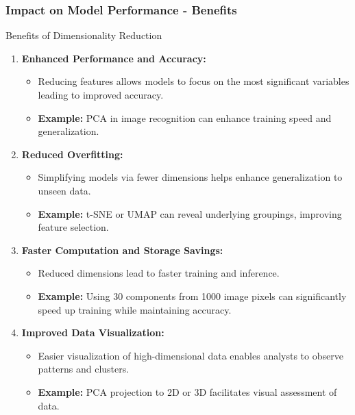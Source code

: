 \documentclass[aspectratio=169]{beamer}
\begin{document}
\begin{frame}[fragile]
    \frametitle{Impact on Model Performance - Benefits}
    \begin{block}{Benefits of Dimensionality Reduction}
        \begin{enumerate}
            \item \textbf{Enhanced Performance and Accuracy:}
            \begin{itemize}
                \item Reducing features allows models to focus on the most significant variables leading to improved accuracy.
                \item \textbf{Example:} PCA in image recognition can enhance training speed and generalization.
            \end{itemize}
            
            \item \textbf{Reduced Overfitting:}
            \begin{itemize}
                \item Simplifying models via fewer dimensions helps enhance generalization to unseen data.
                \item \textbf{Example:} t-SNE or UMAP can reveal underlying groupings, improving feature selection.
            \end{itemize}

            \item \textbf{Faster Computation and Storage Savings:}
            \begin{itemize}
                \item Reduced dimensions lead to faster training and inference.
                \item \textbf{Example:} Using 30 components from 1000 image pixels can significantly speed up training while maintaining accuracy.
            \end{itemize}

            \item \textbf{Improved Data Visualization:}
            \begin{itemize}
                \item Easier visualization of high-dimensional data enables analysts to observe patterns and clusters.
                \item \textbf{Example:} PCA projection to 2D or 3D facilitates visual assessment of data.
            \end{itemize}
        \end{enumerate}
    \end{block}
\end{frame}
\end{document}
